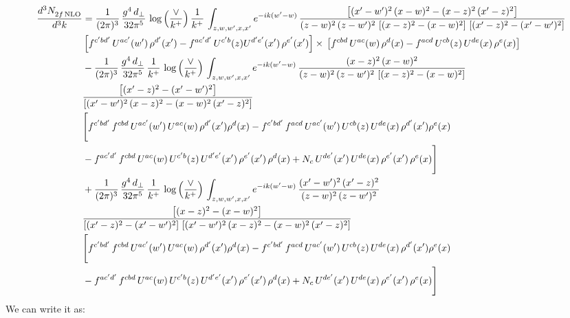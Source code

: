 \documentclass[9pt]{article}
\numberwithin{equation}{section}
\begin{document}
\begin{align}
    \frac{d^{3}N_{2f\,\rm NLO}^{\rm}}{d^{3}k}  & =  \frac{1}{(2\pi)^{3}}\, \frac{g^{4}\,d_{\perp}}{32\pi^{5}}\,\log{\left(\frac{\vee}{k^{+}}\right)}\,\frac{1}{k^{+}}\,\int_{z,w,w^{\prime},x,x'} e^{-ik(w^{\prime}-w)}\,\frac{\left[(x'-w')^{2}\, (x-w)^{2} - (x-z)^{2}\, (x'-z)^{2}\right]}{(z-w)^{2}\, (z-w')^{2}\,\left[(x-z)^{2} - (x-w)^{2}\right]\, \left[(x'-z)^{2} - (x'-w')^{2}\right]}\notag \\ &   \left[f^{c'bd'}\, U^{ac'}(w')\,\rho^{d'}(x')-f^{ac'd'}\, U^{c'b}(z)U^{d'e'}(x')\, \rho^{e'}(x')\right]\times\, \left[f^{cbd}\, U^{ac}(w)\,\rho^{d}(x) - f^{acd}\, U^{cb}(z)\,U^{de}(x)\, \rho^{e}(x)\right]  \notag \\
& - \frac{1}{(2\pi)^{3}}\, \frac{g^{4}\,d_{\perp}}{32\pi^{5}}\,\frac{1}{k^{+}}\,\log{\left(\frac{\vee}{k^{+}}\right)}\,\int_{z,w,w^{\prime},x,x'} e^{-ik(w^{\prime}-w)}\,\frac{(x-z)^{2}\, (x-w)^{2}}{(z-w)^{2}\, (z-w')^{2}\,\left[(x-z)^{2} - (x-w)^{2}\right]}\,\notag \\ & \frac{\left[(x'-z)^{2}-(x'-w')^{2}\right]}{\left[(x'-w')^{2}\, (x-z)^{2} - (x-w)^{2}\, (x'-z)^{2}\right]}\notag \\ & \Bigg[f^{c'bd'}\,f^{cbd}\, U^{ac'}(w')\,U^{ac}(w)\,\rho^{d'}(x')\rho^{d}(x)- f^{c'bd'}\,f^{acd}\,U^{ac'}(w')\,U^{cb}(z)\,U^{de}(x)\,\rho^{d'}(x')\rho^{e}(x) \notag \\ & -f^{ac'd'}\,f^{cbd}\,U^{ac}(w)\,U^{c'b}(z)\,U^{d'e'}(x')\,\rho^{e'}(x')\,\rho^{d}(x) +N_{c}\,U^{de'}(x')\,U^{de}(x)\,\rho^{e'}(x')\,\rho^{e}(x)\Bigg]  \notag \\ & + \frac{1}{(2\pi)^{3}}\, \frac{g^{4}\,d_{\perp}}{32\pi^{5}}\,\frac{1}{k^{+}}\,\log{\left(\frac{\vee}{k^{+}}\right)}\,\int_{z,w,w^{\prime},x,x'} e^{-ik(w^{\prime}-w)}\,\frac{(x'-w')^{2}\, (x'-z)^{2}}{(z-w)^{2}\, (z-w')^{2}}\notag \\ & \frac{\left[(x-z)^{2} - (x-w)^{2}\right]}{\left[(x'-z)^{2} - (x'-w')^{2}\right]\, \left[(x'-w')^{2}\, (x - z)^{2} - (x-w)^{2}\,(x'-z)^{2}\right]}\, \notag \\ &  \Bigg[f^{c'bd'}\,f^{cbd}\, U^{ac'}(w')\,U^{ac}(w)\,\rho^{d'}(x')\rho^{d}(x)- f^{c'bd'}\,f^{acd}\,U^{ac'}(w')\,U^{cb}(z)\,U^{de}(x)\,\rho^{d'}(x')\rho^{e}(x) \notag \\ & -f^{ac'd'}\,f^{cbd}\,U^{ac}(w)\,U^{c'b}(z)\,U^{d'e'}(x')\,\rho^{e'}(x')\,\rho^{d}(x) +N_{c}\,U^{de'}(x')\,U^{de}(x)\,\rho^{e'}(x')\,\rho^{e}(x)\Bigg] 
\end{align}
We can write it as:
\end{document}
